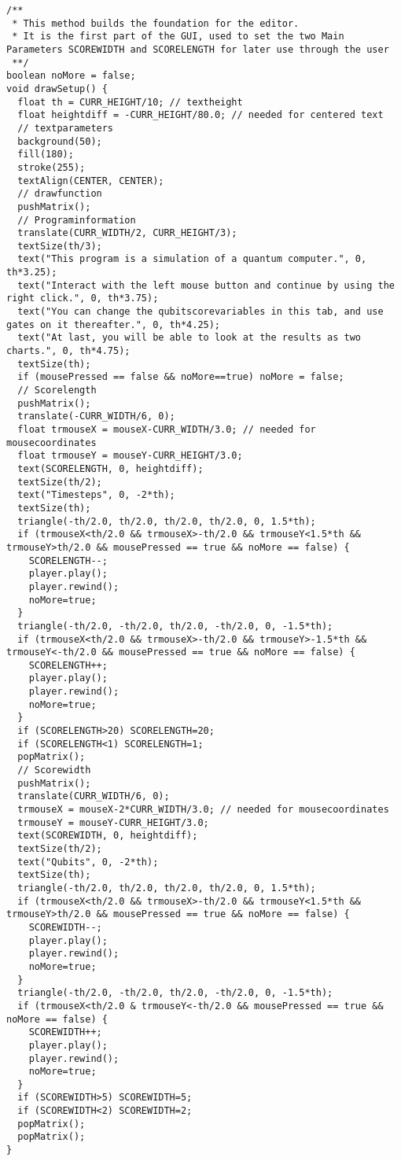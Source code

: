 \documentclass[12pt]{report}
\begin{document}
\begin{lstlisting}
/**
 * This method builds the foundation for the editor.
 * It is the first part of the GUI, used to set the two Main Parameters SCOREWIDTH and SCORELENGTH for later use through the user
 **/
boolean noMore = false;
void drawSetup() {
  float th = CURR_HEIGHT/10; // textheight
  float heightdiff = -CURR_HEIGHT/80.0; // needed for centered text
  // textparameters
  background(50);
  fill(180); 
  stroke(255);
  textAlign(CENTER, CENTER);
  // drawfunction
  pushMatrix();
  // Programinformation
  translate(CURR_WIDTH/2, CURR_HEIGHT/3);
  textSize(th/3);
  text("This program is a simulation of a quantum computer.", 0, th*3.25);
  text("Interact with the left mouse button and continue by using the right click.", 0, th*3.75);
  text("You can change the qubitscorevariables in this tab, and use gates on it thereafter.", 0, th*4.25);
  text("At last, you will be able to look at the results as two charts.", 0, th*4.75);
  textSize(th);
  if (mousePressed == false && noMore==true) noMore = false;
  // Scorelength
  pushMatrix();
  translate(-CURR_WIDTH/6, 0);
  float trmouseX = mouseX-CURR_WIDTH/3.0; // needed for mousecoordinates
  float trmouseY = mouseY-CURR_HEIGHT/3.0;
  text(SCORELENGTH, 0, heightdiff);
  textSize(th/2);
  text("Timesteps", 0, -2*th);
  textSize(th);
  triangle(-th/2.0, th/2.0, th/2.0, th/2.0, 0, 1.5*th);
  if (trmouseX<th/2.0 && trmouseX>-th/2.0 && trmouseY<1.5*th && trmouseY>th/2.0 && mousePressed == true && noMore == false) { 
    SCORELENGTH--;
    player.play(); 
    player.rewind();
    noMore=true;
  }
  triangle(-th/2.0, -th/2.0, th/2.0, -th/2.0, 0, -1.5*th);
  if (trmouseX<th/2.0 && trmouseX>-th/2.0 && trmouseY>-1.5*th && trmouseY<-th/2.0 && mousePressed == true && noMore == false) { 
    SCORELENGTH++;
    player.play(); 
    player.rewind();
    noMore=true;
  }
  if (SCORELENGTH>20) SCORELENGTH=20;
  if (SCORELENGTH<1) SCORELENGTH=1;
  popMatrix();
  // Scorewidth
  pushMatrix();
  translate(CURR_WIDTH/6, 0);
  trmouseX = mouseX-2*CURR_WIDTH/3.0; // needed for mousecoordinates
  trmouseY = mouseY-CURR_HEIGHT/3.0;
  text(SCOREWIDTH, 0, heightdiff);
  textSize(th/2);
  text("Qubits", 0, -2*th);
  textSize(th);
  triangle(-th/2.0, th/2.0, th/2.0, th/2.0, 0, 1.5*th);
  if (trmouseX<th/2.0 && trmouseX>-th/2.0 && trmouseY<1.5*th && trmouseY>th/2.0 && mousePressed == true && noMore == false) { 
    SCOREWIDTH--;
    player.play(); 
    player.rewind();
    noMore=true;
  }
  triangle(-th/2.0, -th/2.0, th/2.0, -th/2.0, 0, -1.5*th);
  if (trmouseX<th/2.0 & trmouseY<-th/2.0 && mousePressed == true && noMore == false) { 
    SCOREWIDTH++;
    player.play(); 
    player.rewind();
    noMore=true;
  }
  if (SCOREWIDTH>5) SCOREWIDTH=5;
  if (SCOREWIDTH<2) SCOREWIDTH=2;
  popMatrix();
  popMatrix();
}


\end{lstlisting}
\end{document}
